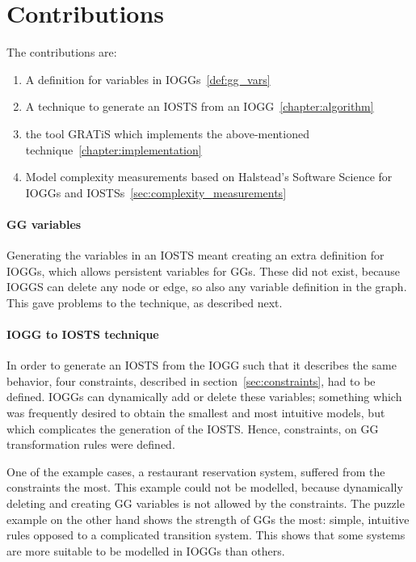 \section{Contributions}
The contributions are:
\begin{enumerate}
\item A definition for variables in IOGGs~\ref{def:gg_vars}
\item A technique to generate an IOSTS from an IOGG~\ref{chapter:algorithm}
\item the tool GRATiS which implements the above-mentioned technique~\ref{chapter:implementation}
\item Model complexity measurements based on Halstead's Software Science for IOGGs and IOSTSs~\ref{sec:complexity_measurements}
\end{enumerate}

\paragraph*{GG variables}
Generating the variables in an IOSTS meant creating an extra definition for IOGGs, which allows persistent variables for GGs. These did not exist, because IOGGS can delete any node or edge, so also any variable definition in the graph. This gave problems to the technique, as described next.

\paragraph*{IOGG to IOSTS technique}
In order to generate an IOSTS from the IOGG such that it describes the same behavior, four constraints, described in section~\ref{sec:constraints}, had to be defined. IOGGs can dynamically add or delete these variables; something which was frequently desired to obtain the smallest and most intuitive models, but which complicates the generation of the IOSTS. Hence, constraints, on GG transformation rules were defined.

One of the example cases, a restaurant reservation system, suffered from the constraints the most. This example could not be modelled, because dynamically deleting and creating GG variables is not allowed by the constraints. The puzzle example on the other hand shows the strength of GGs the most: simple, intuitive rules opposed to a complicated transition system. This shows that some systems are more suitable to be modelled in IOGGs than others.

